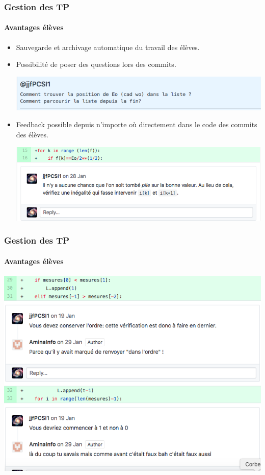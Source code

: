 \begin{frame}
	\frametitle{Gestion des TP}
	\framesubtitle{Avantages élèves}

	\begin{itemize}[<+->]
		\item Sauvegarde et archivage automatique du travail des élèves.

		\item Possibilité de poser des questions lors des commits.

		 {
		\begin{center}
				\includegraphics[width=0.8\linewidth]{figures/github_questions_commit.png}
		\end{center}
		}

		\item Feedback possible depuis n'importe où directement dans le code des commits des élèves.

		\visible<3-> {
			\begin{center}
					\includegraphics[width=0.8\linewidth]{figures/github_commentaires_commit.png}
			\end{center}
		}

	\end{itemize}

\end{frame}

\begin{frame}
	\frametitle{Gestion des TP}
	\framesubtitle{Avantages élèves}

	\begin{center}
		\includegraphics[width=0.8\linewidth]{figures/TP_note_info.png}
	\end{center}

\end{frame}

